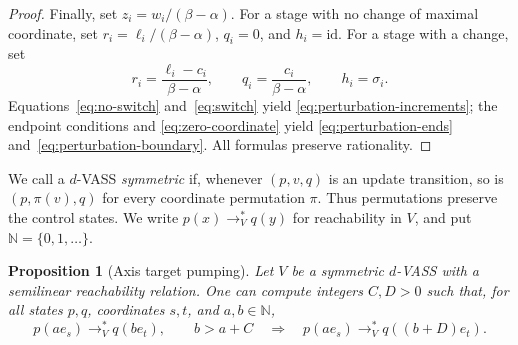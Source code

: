 \documentclass[11pt]{article}
\newtheorem{proposition}{Proposition}
\begin{document}
\begin{proof}
Finally, set $z_i=w_i/(\beta-\alpha)$. For a stage with no change of
maximal coordinate, set $r_i=\ell_i/(\beta-\alpha)$, $q_i=0$, and
$h_i=\mathrm{id}$. For a stage with a change, set
\[
  r_i=\frac{\ell_i-c_i}{\beta-\alpha},\qquad
  q_i=\frac{c_i}{\beta-\alpha},\qquad h_i=\sigma_i.
\]
Equations~\eqref{eq:no-switch} and~\eqref{eq:switch} yield
\eqref{eq:perturbation-increments}; the endpoint conditions and
\eqref{eq:zero-coordinate} yield
\eqref{eq:perturbation-ends} and~\eqref{eq:perturbation-boundary}.
All formulas preserve rationality.
\end{proof}

We call a $d$-VASS \emph{symmetric} if, whenever $(p,v,q)$ is an
update transition, so is $(p,\pi(v),q)$ for every coordinate
permutation $\pi$. Thus permutations preserve the control states.
We write $p(x)\longrightarrow_V^*q(y)$ for reachability in $V$,
and put $\mathbb{N}=\{0,1,\ldots\}$.

\begin{proposition}[Axis target pumping]\label{prop:axis-pumping}
Let $V$ be a symmetric $d$-VASS with a semilinear reachability
relation. One can compute integers $C,D>0$ such that, for all
states $p,q$, coordinates $s,t$, and $a,b\in\mathbb{N}$,
\[
  p(ae_s)\longrightarrow_V^*q(be_t),\qquad b>a+C
  \quad\Longrightarrow\quad
  p(ae_s)\longrightarrow_V^*q((b+D)e_t).
\]
\end{proposition}
\end{document}

